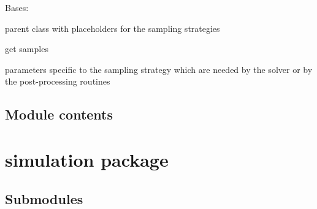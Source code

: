 \documentclass[letterpaper,10pt,english]{sphinxmanual}
\begin{document}
\begin{fulllineitems}
\label{\detokenize{sampling:sampling.sampling.Sampling}}
Bases: {\hyperref[\detokenize{helpers:helpers.baseclass.BaseClass}]{}}

parent class with placeholders for the sampling strategies

\begin{fulllineitems}
\label{\detokenize{sampling:sampling.sampling.Sampling.get}}
get samples

\end{fulllineitems}


\begin{fulllineitems}
\label{\detokenize{sampling:sampling.sampling.Sampling.sampling_prms}}
parameters specific to the sampling strategy which are
needed by the solver or by the post-processing routines

\end{fulllineitems}


\end{fulllineitems}



\section{Module contents}
\label{\detokenize{sampling:module-sampling}}\label{\detokenize{sampling:module-contents}}

\chapter{simulation package}
\label{\detokenize{simulation:simulation-package}}\label{\detokenize{simulation::doc}}

\section{Submodules}
\label{\detokenize{simulation:submodules}}
\end{document}
